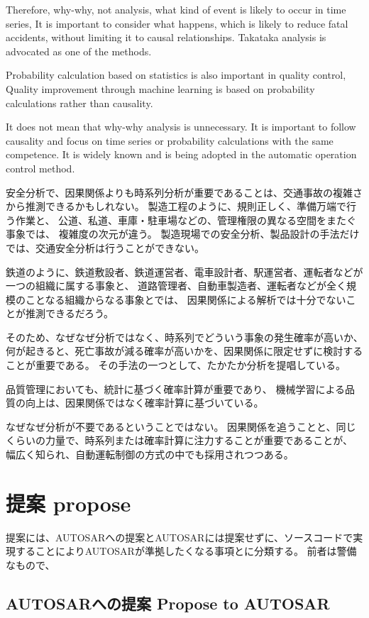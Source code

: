 \documentclass[twocolumn]{article} %
\begin{document}
Therefore, why-why, not analysis, what kind of event is likely to occur in time series,
It is important to consider what happens, which is likely to reduce fatal accidents, without limiting it to causal relationships.
Takataka analysis is advocated as one of the methods.

Probability calculation based on statistics is also important in quality control,
Quality improvement through machine learning is based on probability calculations rather than causality.

It does not mean that why-why analysis is unnecessary.
It is important to follow causality and focus on time series or probability calculations with the same competence.
It is widely known and is being adopted in the automatic operation control method.

安全分析で、因果関係よりも時系列分析が重要であることは、交通事故の複雑さから推測できるかもしれない。
製造工程のように、規則正しく、準備万端で行う作業と、
公道、私道、車庫・駐車場などの、管理権限の異なる空間をまたぐ事象では、
複雑度の次元が違う。
製造現場での安全分析、製品設計の手法だけでは、交通安全分析は行うことができない。

鉄道のように、鉄道敷設者、鉄道運営者、電車設計者、駅運営者、運転者などが一つの組織に属する事象と、
道路管理者、自動車製造者、運転者などが全く規模のことなる組織からなる事象とでは、
因果関係による解析では十分でないことが推測できるだろう。

そのため、なぜなぜ分析ではなく、時系列でどういう事象の発生確率が高いか、
何が起きると、死亡事故が減る確率が高いかを、因果関係に限定せずに検討することが重要である。
その手法の一つとして、たかたか分析を提唱している。

品質管理においても、統計に基づく確率計算が重要であり、
機械学習による品質の向上は、因果関係ではなく確率計算に基づいている。

なぜなぜ分析が不要であるということではない。
因果関係を追うことと、同じくらいの力量で、時系列または確率計算に注力することが重要であることが、
幅広く知られ、自動運転制御の方式の中でも採用されつつある。

\section{提案 propose}
提案には、AUTOSARへの提案とAUTOSARには提案せずに、ソースコードで実現することによりAUTOSARが準拠したくなる事項とに分類する。
前者は警備なもので、
\subsection{AUTOSARへの提案 Propose to AUTOSAR}
\end{document}
